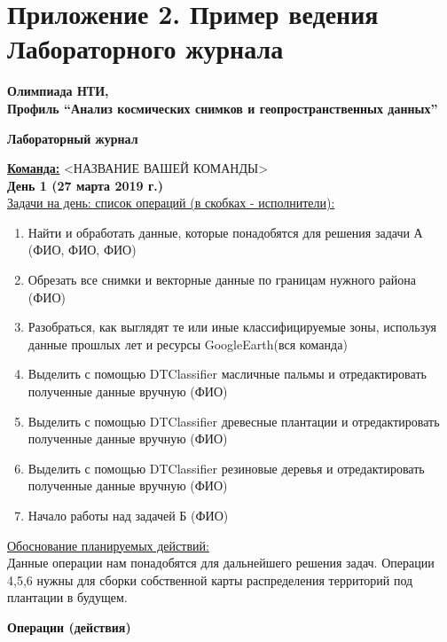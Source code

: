 \section*{Приложение 2. Пример ведения Лабораторного журнала}

\begin{center}
    \textbf{Олимпиада НТИ,\\Профиль “Анализ космических снимков и геопространственных данных”}
\end{center}

\begin{center}
    \textbf{Лабораторный журнал}
\end{center}

\noindent\textbf{\underline{Команда:}} <НАЗВАНИЕ ВАШЕЙ КОМАНДЫ>\\

\noindent\textbf{День 1 (27 марта 2019 г.)}\\

\noindent\underline{Задачи на день: список операций (в скобках - исполнители):}

\begin{enumerate}
    \item Найти и обработать данные, которые понадобятся для решения задачи А (ФИО, ФИО, ФИО)
    \item Обрезать все снимки и векторные данные по границам нужного района (ФИО)
    \item Разобраться, как выглядят те или иные классифицируемые зоны, используя данные прошлых лет и ресурсы GoogleEarth(вся команда)
    \item Выделить с помощью DTClassifier масличные пальмы и отредактировать полученные данные вручную (ФИО)
    \item Выделить с помощью DTClassifier древесные плантации и отредактировать полученные данные вручную (ФИО)
    \item Выделить с помощью DTClassifier резиновые деревья и отредактировать полученные данные вручную (ФИО)
    \item Начало работы над задачей Б (ФИО)  
\end{enumerate}

\noindent\underline{Обоснование планируемых действий:}\\
Данные операции нам понадобятся для дальнейшего решения задач. Операции 4,5,6 нужны для сборки собственной карты распределения территорий под плантации в будущем.

\textbf{Операции (действия)}

